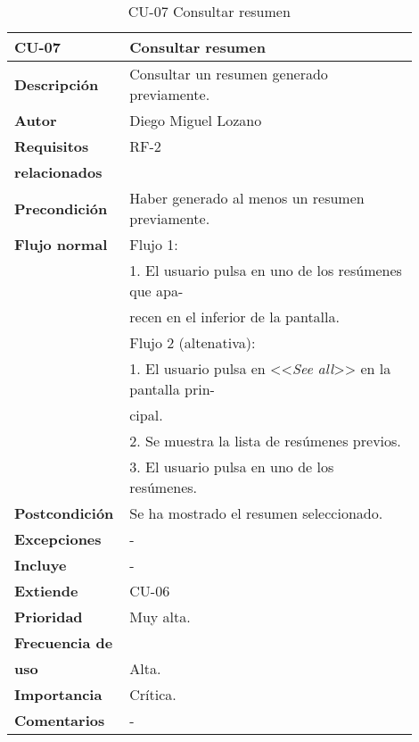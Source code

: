 \begin{longtable}{>{\raggedright}b{0.2\linewidth}>{\raggedright\arraybackslash}b{0.7\linewidth}}
	\toprule
	\textbf{CU-07} & \textbf{Consultar resumen} \\
	\toprule
	\endhead
	
	\toprule
	\caption{CU-07 Consultar resumen}
	\endfoot
	
	\small{\textbf{Descripción}} & Consultar un resumen generado previamente. \\
	\small{\textbf{Autor}} & Diego Miguel Lozano \\
	\small{\textbf{Requisitos}} & RF-2  \\
	\small{\textbf{relacionados}} & \\
	\small{\textbf{Precondición}} &  Haber generado al menos un resumen previamente. \\
	\small{\textbf{Flujo normal}} & \small{Flujo 1:} \\
	& \quad \small{1. El usuario pulsa en uno de los resúmenes que apa-} \\
	& \qquad \small{recen en el inferior de la pantalla.} \\
	& \small{Flujo 2 (altenativa):} \\
	& \quad \small{1. El usuario pulsa en <<\emph{See all}>> en la pantalla prin-} \\
	& \qquad \small{cipal.} \\
	& \quad \small{2. Se muestra la lista de resúmenes previos.} \\
	& \quad \small{3. El usuario pulsa en uno de los resúmenes.} \\
	\small{\textbf{Postcondición}} & Se ha mostrado el resumen seleccionado. \\
	\small{\textbf{Excepciones}} & - \\
	\small{\textbf{Incluye}} & -\\
	\small{\textbf{Extiende}} & CU-06 \\
	\small{\textbf{Prioridad}} & Muy alta. \\
	\small{\textbf{Frecuencia de}} & \\
	\small{\textbf{uso}} & Alta. \\
	\small{\textbf{Importancia}} & Crítica. \\
	\small{\textbf{Comentarios}} & - \\
\end{longtable}


